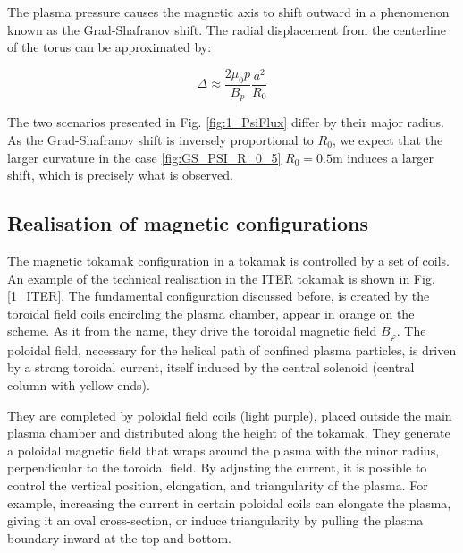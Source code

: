 The plasma pressure causes the magnetic axis to shift outward in a phenomenon known as the Grad-Shafranov shift. The radial displacement from the centerline of the torus can be approximated by:

\begin{equation}
	\label{eq:intro_GradShafranovShift}
	\Delta \approx \frac{2\mu_0 p}{B_p}\frac{a^2}{R_0}
\end{equation}

The two scenarios presented in Fig. \ref{fig:1_PsiFlux} differ by their major radius. As the Grad-Shafranov shift is inversely proportional to $R_0$, we expect that the larger curvature in the case \ref{fig:GS_PSI_R_0_5} $R_0 = 0.5$m induces a larger shift, which is precisely what is observed.



\subsection{Realisation of magnetic configurations}
\label{ssec:intro_limitedDivertedConfig}

The magnetic tokamak configuration in a tokamak is controlled by a set of coils. An example of the technical realisation in the ITER tokamak is shown in Fig. \ref{1_ITER}. The fundamental configuration discussed before, is created by the toroidal field coils encircling the plasma chamber, appear in orange on the scheme. As it  from the name, they drive the toroidal magnetic field $B_\varphi$. The poloidal field, necessary for the helical path of confined plasma particles, is driven by a strong toroidal current, itself induced by the central solenoid (central column with yellow ends). 

They are completed by poloidal field coils (light purple), placed outside the main plasma chamber and distributed along the height of the tokamak. They generate a poloidal magnetic field that wraps around the plasma with the minor radius, perpendicular to the toroidal field. By adjusting the current, it is possible to control the vertical position, elongation, and triangularity of the plasma. For example, increasing the current in certain poloidal coils can elongate the plasma, giving it an oval cross-section, or induce triangularity by pulling the plasma boundary inward at the top and bottom. 

